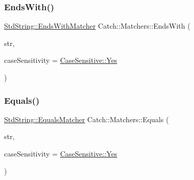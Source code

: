 \mbox{\label{namespace_catch_1_1_matchers_ae5a45efb4538c57c43e04f3f9043ad6e}} 
\subsubsection{\texorpdfstring{Ends\+With()}{EndsWith()}}
{\footnotesize\ttfamily \mbox{\hyperlink{struct_catch_1_1_matchers_1_1_std_string_1_1_ends_with_matcher}{Std\+String\+::\+Ends\+With\+Matcher}} Catch\+::\+Matchers\+::\+Ends\+With (\begin{DoxyParamCaption}\item[{std\+::string const \&}]{str,  }\item[{\mbox{\hyperlink{struct_catch_1_1_case_sensitive_aad49d3aee2d97066642fffa919685c6a}{Case\+Sensitive\+::\+Choice}}}]{case\+Sensitivity = {\ttfamily \mbox{\hyperlink{struct_catch_1_1_case_sensitive_aad49d3aee2d97066642fffa919685c6aa7c5550b69ec3c502e6f609b67f9613c6}{Case\+Sensitive\+::\+Yes}}} }\end{DoxyParamCaption})}

\mbox{\label{namespace_catch_1_1_matchers_af8af7dfc338335ed4c788cb1b37fc59f}} 
\subsubsection{\texorpdfstring{Equals()}{Equals()}\hspace{0.1cm}{\footnotesize\ttfamily [1/2]}}
{\footnotesize\ttfamily \mbox{\hyperlink{struct_catch_1_1_matchers_1_1_std_string_1_1_equals_matcher}{Std\+String\+::\+Equals\+Matcher}} Catch\+::\+Matchers\+::\+Equals (\begin{DoxyParamCaption}\item[{std\+::string const \&}]{str,  }\item[{\mbox{\hyperlink{struct_catch_1_1_case_sensitive_aad49d3aee2d97066642fffa919685c6a}{Case\+Sensitive\+::\+Choice}}}]{case\+Sensitivity = {\ttfamily \mbox{\hyperlink{struct_catch_1_1_case_sensitive_aad49d3aee2d97066642fffa919685c6aa7c5550b69ec3c502e6f609b67f9613c6}{Case\+Sensitive\+::\+Yes}}} }\end{DoxyParamCaption})}

